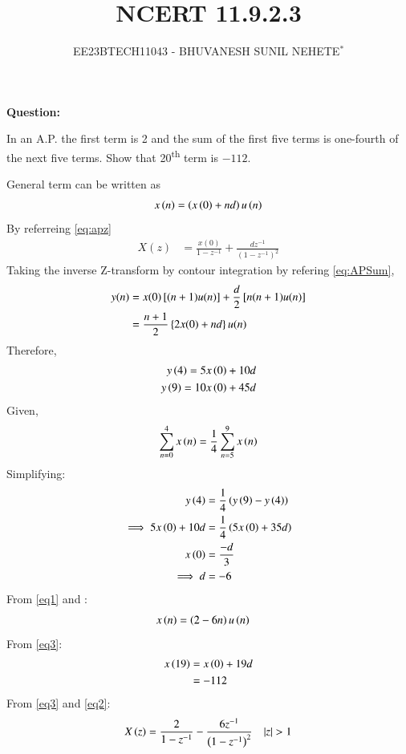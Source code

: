 \documentclass[journal,12pt,twocolumn]{IEEEtran}
\theoremstyle{remark}
\begin{document}

\vspace{3cm}

\title{NCERT 11.9.2.3}
\author{EE23BTECH11043 - BHUVANESH SUNIL NEHETE$^{*}$%
}
\maketitle
\newpage
\bigskip

\renewcommand{\thefigure}{\theenumi}
\renewcommand{\thetable}{\theenumi}



\textbf{Question:}

In an A.P. the first term is 2 and the sum of the first five terms is one-fourth of the next five terms. Show  that 20\textsuperscript{th} term is $-112$.

\solution


General term can be written as
\begin{align}
    x\left(n\right) = \left(x\left(0\right) + nd\right)u\left(n\right)
\end{align}
By referreing \eqref{eq:apz}
\begin{align}
    X(z) &= \frac{x(0)}{1-z^{-1}} + \frac{dz^{-1}}{(1-z^{-1})^{2}}\label{eq2}
\end{align}
Taking the inverse Z-transform by contour integration by refering \eqref{eq:APSum},
\begin{align}
    y(n) &= x(0){}\left[(n + 1)u(n)\right] + \frac{d}{2}{}\left[n(n + 1)u(n)\right]\\
    &= \frac{n+1}{2}\left\{2x(0) + nd\right\}u(n)
\end{align}
Therefore, 
\begin{align}
    y\left(4\right)=5x\left(0\right)+10d\\
    y\left(9\right)=10x\left(0\right)+45d
\end{align}
Given, 
   \begin{align}
       \sum_{n=0}^{4}x\left(n\right) = \frac{1}{4}\sum_{n=5}^{9}x\left(n\right)
   \end{align}
Simplifying:
    \begin{align}
        y\left(4\right) &= \frac{1}{4}\left(y\left(9\right)-y\left(4\right)\right)\\
        \implies 5x\left(0\right) + 10d &= \frac{1}{4}\left(5x\left(0\right) + 35d\right)\\
        x\left(0\right) &= \frac{-d}{3}\\
        \implies d &= -6 \label{eq1}
    \end{align}
From \eqref{eq1} and :
    \begin{align}
        x\left(n\right)&=\left(2-6n\right)u\left(n\right) \label{eq3}
   \end{align} 
From \eqref{eq3}:
    \begin{align}
        x\left(19\right)&=x\left(0\right)+19d\\ 
        &= -112
    \end{align}    
From \eqref{eq3} and \eqref{eq2}:
    \begin{align}
        X\brak{z}=\frac{2}{1-z^{-1}} - \frac{6z^{-1}}{\brak{1-z^{-1}}^{2}} \quad |z|>1
    \end{align}
\end{document}
